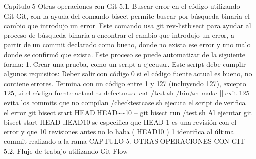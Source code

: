 \documentclass[12pt, spanish, oneside, onecolumn, a4paper]{report}
\begin{document}
 Capítulo 5
Otras operaciones con Git
5.1. Buscar error en el código utilizando Git
Git, con la ayuda del comando  bisect  permite buscar por búsqueda binaria el cambio que introdujo un error. Este comando usa git rev-listbisect para ayudar al proceso de búsqueda binaria a encontrar el cambio que introdujo un error, a partir de un commit declarado como bueno, donde no exista ese error y uno malo donde se confirmó que exista.
Este proceso se puede automatizar de la siguiente forma:
1. Crear una prueba, como un script a ejecutar. Este script debe cumplir algunos requisitos:
Deber salir con código 0 si el código fuente actual es bueno, no contiene errores.
Termina con un código entre 1 y 127 (incluyendo 127), excepto 125, si el código fuente actual es defectuoso.
 cat /test.sh /bin/sh make || exit 125  evita los commits que no compilan /checktestcase.sh  ejecuta el script de verifica el error  git bisect start HEAD HEAD\~{}\~{}10 --  git bisect run /test.sh
Al ejecutar git bisect start HEAD HEAD10 se especifica que HEAD 1 es una revisión con el error y que 10 revisiones antes no lo haba ( HEAD10 ) 1 identifica al última commit realizado a la rama
 CAPTULO 5. OTRAS OPERACIONES CON GIT 5.2. Flujo de trabajo utilizando Git-Flow

















\glsaddall
\printglossaries
\end{document}
